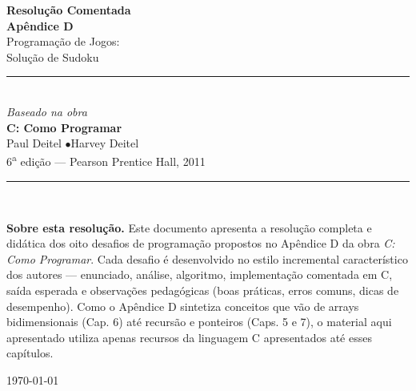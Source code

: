 \documentclass[11pt,a4paper,oneside]{report}
\begin{document}
\begin{titlepage}
\centering
\vspace*{1.5cm}
{\Huge\bfseries\color{deitelblue} Resolução Comentada}\\[0.5cm]
{\LARGE\bfseries\color{deitelblue} Apêndice D}\\[0.4cm]
{\Large\color{deitelgray} Programação de Jogos:}\\[0.2cm]
{\Large\color{deitelgray} Solução de Sudoku}\\[1.5cm]
\rule{0.7\textwidth}{1pt}\\[0.8cm]
{\large\textit{Baseado na obra}}\\[0.4cm]
{\Large\bfseries C: Como Programar}\\[0.2cm]
{\large Paul Deitel \quad$\bullet$\quad Harvey Deitel}\\[0.2cm]
{\normalsize 6\textsuperscript{a} edição --- Pearson Prentice Hall, 2011}\\[1.2cm]
\rule{0.7\textwidth}{1pt}\\[1.5cm]

\begin{tcolorbox}[
    colback=deitellightblue,
    colframe=deitelblue,
    width=0.85\textwidth,
    arc=4pt,
    boxrule=1pt
]
\small
\textbf{Sobre esta resolução.} Este documento apresenta a resolução completa
e didática dos oito desafios de programação propostos no Apêndice D da obra
\textit{C: Como Programar}. Cada desafio é desenvolvido no estilo
incremental característico dos autores --- enunciado, análise, algoritmo,
implementação comentada em C, saída esperada e observações pedagógicas
(boas práticas, erros comuns, dicas de desempenho). Como o Apêndice D
sintetiza conceitos que vão de arrays bidimensionais (Cap. 6) até recursão
e ponteiros (Caps. 5 e 7), o material aqui apresentado utiliza apenas
recursos da linguagem C apresentados até esses capítulos.
\end{tcolorbox}

\vfill
{\small\color{deitelgray}\today}
\end{titlepage}

\tableofcontents
\thispagestyle{fancy}
\newpage

\end{document}
